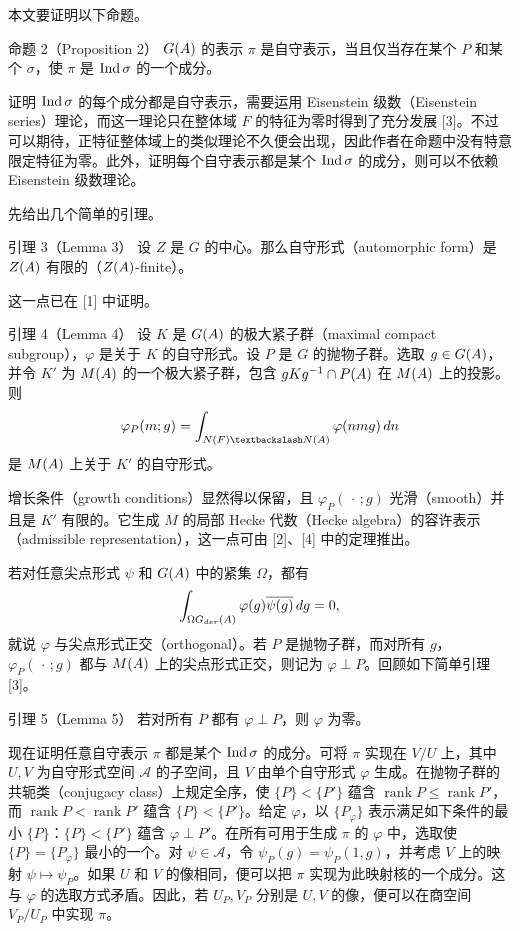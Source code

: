 本文要证明以下命题。
\begin{originaltheorem}{命题 2（Proposition 2）}
$G(A)$ 的表示 $\pi$ 是自守表示，当且仅当存在某个 $P$ 和某个 $\sigma$，使 $\pi$ 是 $\operatorname{Ind}\sigma$ 的一个成分。
\end{originaltheorem}

证明 $\operatorname{Ind}\sigma$ 的每个成分都是自守表示，需要运用 Eisenstein 级数（Eisenstein series）理论，而这一理论只在整体域 $F$ 的特征为零时得到了充分发展 [3]。不过可以期待，正特征整体域上的类似理论不久便会出现，因此作者在命题中没有特意限定特征为零。此外，证明每个自守表示都是某个 $\operatorname{Ind}\sigma$ 的成分，则可以不依赖 Eisenstein 级数理论。

先给出几个简单的引理。
\begin{originaltheorem}{引理 3（Lemma 3）}
设 $Z$ 是 $G$ 的中心。那么自守形式（automorphic form）是 $Z(A)$ 有限的（$Z(A)$-finite）。
\end{originaltheorem}
这一点已在 [1] 中证明。

\begin{originaltheorem}{引理 4（Lemma 4）}
设 $K$ 是 $G(A)$ 的极大紧子群（maximal compact subgroup），$\varphi$ 是关于 $K$ 的自守形式。设 $P$ 是 $G$ 的抛物子群。选取 $g\in G(A)$，并令 $K'$ 为 $M(A)$ 的一个极大紧子群，包含 $gKg^{-1}\cap P(A)$ 在 $M(A)$ 上的投影。则
\[
\varphi_P(m;g)=\int_{N(F)\backslash N(\A)}\varphi(nmg)\,dn
\]
是 $M(A)$ 上关于 $K'$ 的自守形式。
\end{originaltheorem}
增长条件（growth conditions）显然得以保留，且 $\varphi_P(\,\cdot\,;g)$ 光滑（smooth）并且是 $K'$ 有限的。它生成 $M$ 的局部 Hecke 代数（Hecke algebra）的容许表示（admissible representation），这一点可由 [2]、[4] 中的定理推出。

若对任意尖点形式 $\psi$ 和 $G(A)$ 中的紧集 $\Omega$，都有
\[
\int_{\Omega G_{der}(A)}\varphi(g)\overline{\psi(g)}\,dg=0,
\]
就说 $\varphi$ 与尖点形式正交（orthogonal）。若 $P$ 是抛物子群，而对所有 $g$，$\varphi_P(\,\cdot\,;g)$ 都与 $M(A)$ 上的尖点形式正交，则记为 $\varphi\perp P$。回顾如下简单引理 [3]。
\begin{originaltheorem}{引理 5（Lemma 5）}
若对所有 $P$ 都有 $\varphi\perp P$，则 $\varphi$ 为零。
\end{originaltheorem}

现在证明任意自守表示 $\pi$ 都是某个 $\operatorname{Ind}\sigma$ 的成分。可将 $\pi$ 实现在 $V/U$ 上，其中 $U,V$ 为自守形式空间 $\mathcal A$ 的子空间，且 $V$ 由单个自守形式 $\varphi$ 生成。在抛物子群的共轭类（conjugacy class）上规定全序，使 $\{P\}<\{P'\}$ 蕴含 $\operatorname{rank}P\leq\operatorname{rank}P'$，而 $\operatorname{rank}P<\operatorname{rank}P'$ 蕴含 $\{P\}<\{P'\}$。给定 $\varphi$，以 $\{P_\varphi\}$ 表示满足如下条件的最小 $\{P\}$：$\{P\}<\{P'\}$ 蕴含 $\varphi\perp P'$。在所有可用于生成 $\pi$ 的 $\varphi$ 中，选取使 $\{P\}=\{P_\varphi\}$ 最小的一个。对 $\psi\in\mathcal A$，令 $\psi_P(g)=\psi_P(1,g)$，并考虑 $V$ 上的映射 $\psi\mapsto\psi_P$。如果 $U$ 和 $V$ 的像相同，便可以把 $\pi$ 实现为此映射核的一个成分。这与 $\varphi$ 的选取方式矛盾。因此，若 $U_P,V_P$ 分别是 $U,V$ 的像，便可以在商空间 $V_P/U_P$ 中实现 $\pi$。

